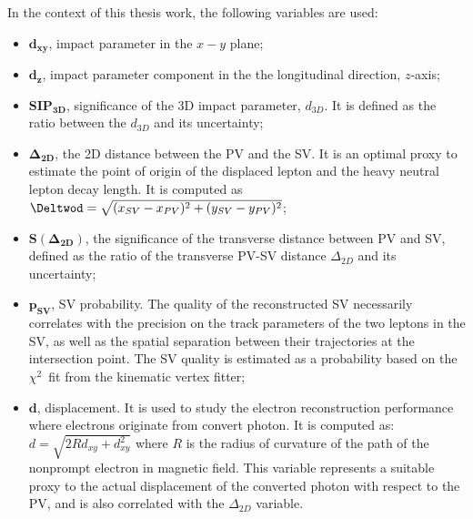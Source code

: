 In the context of this thesis work, the following variables are used:
\begin{itemize}
\item $\boldsymbol{d_{xy}}$, impact parameter in the $x-y$ plane;
\item $\boldsymbol{d_z}$, impact parameter component in the the
  longitudinal direction, $z$-axis;
\item $\boldsymbol{SIP_{3D}}$, significance of the 3D impact parameter, $d_{3D}$. It is defined as the ratio between the $d_{3D}$ and its
  uncertainty; 
\item $\boldsymbol{\Delta_{2D}}$, the 2D distance between the PV and
  the SV. It is an optimal proxy to estimate the point of origin of the
displaced lepton and the heavy neutral lepton decay length. It is
computed as $\Deltwod = \sqrt{(x_{SV}-x_{PV})^{2} + (y_{SV}-y_{PV})^{2}}$;
\item $\boldsymbol{ S(\Delta_{2D})}$, the significance of the transverse distance
  between PV and SV, defined as the ratio of the transverse PV-SV
  distance $\Delta_{2D}$ and its uncertainty;
\item $\boldsymbol{ p_{SV}}$, SV probability. The quality of the reconstructed SV
  necessarily correlates with the precision on the track parameters of
  the two leptons in the SV, as well as the spatial separation between their
  trajectories at the intersection point. The SV quality is estimated as a probability based on the
$\chi^2$~fit from the kinematic vertex fitter;
\item $\boldsymbol{d}$, displacement. It is used to study the electron
  reconstruction performance where electrons originate from convert
  photon.
It is computed as: $d = \sqrt{2R d_{xy}+d_{xy}^2}$ where $R$ is the radius of curvature of
  the path of the nonprompt electron in magnetic field. This variable represents a suitable
  proxy to the actual displacement of the converted photon with
respect to the PV, and is also correlated with the $\Delta_{2D}$ variable.
\end{itemize}


